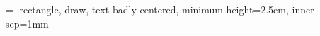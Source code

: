 % 


\newcommand{\propnode}[5]{%
	\pgfmathsetmacro{\minimalwidth}{sqrt (#4*\nodebasesize)}
	\node[#3,minimum width=\minimalwidth*1cm,inner sep=\nodeinnersep*0cm,circle,draw] 
	(#2) at (#1) {#5};
}

 = [rectangle, draw, text badly centered, minimum height=2.5em, inner sep=1mm]
\newcommand{\bloq}[4]{%
	\node[bloq,#3] (#2) at (#1) {\textsf{#4}}; 
}
\newcommand{\add}[2]{%
	\draw (4,4) circle [radius=0.3] node (add) {\textsf$+$};
}


